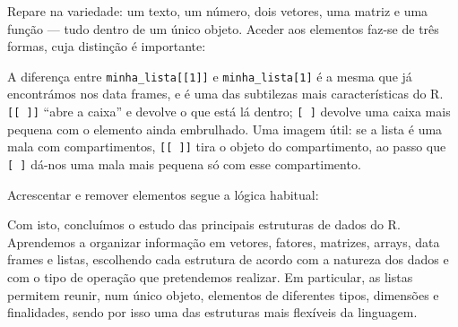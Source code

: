 \documentclass[
  portuguese,
  11pt,
  openany]{book}
\newenvironment{Shaded}{\begin{snugshade}}{\end{snugshade}}
\newcommand{\CommentTok}[1]{\textcolor[rgb]{0.56,0.35,0.01}{\textit{#1}}}
\newcommand{\ConstantTok}[1]{\textcolor[rgb]{0.56,0.35,0.01}{#1}}
\newcommand{\DecValTok}[1]{\textcolor[rgb]{0.00,0.00,0.81}{#1}}
\newcommand{\DocumentationTok}[1]{\textcolor[rgb]{0.56,0.35,0.01}{\textbf{\textit{#1}}}}
\newcommand{\FunctionTok}[1]{\textcolor[rgb]{0.13,0.29,0.53}{\textbf{#1}}}
\newcommand{\NormalTok}[1]{#1}
\newcommand{\OtherTok}[1]{\textcolor[rgb]{0.56,0.35,0.01}{#1}}
\newcommand{\SpecialCharTok}[1]{\textcolor[rgb]{0.81,0.36,0.00}{\textbf{#1}}}
\begin{document}
Repare na variedade: um texto, um número, dois vetores, uma matriz e uma função ---
tudo dentro de um único objeto. Aceder aos elementos faz-se de três formas, cuja
distinção é importante:

\begin{Shaded}
\end{Shaded}

A diferença entre \texttt{minha\_lista{[}{[}1{]}{]}} e \texttt{minha\_lista{[}1{]}} é a mesma que já
encontrámos nos data frames, e é uma das subtilezas mais características do R.
\texttt{{[}{[}\ {]}{]}} ``abre a caixa'' e devolve o que está lá dentro; \texttt{{[}\ {]}} devolve uma caixa
mais pequena com o elemento ainda embrulhado. Uma imagem útil: se a lista é uma
mala com compartimentos, \texttt{{[}{[}\ {]}{]}} tira o objeto do compartimento, ao passo que
\texttt{{[}\ {]}} dá-nos uma mala mais pequena só com esse compartimento.

Acrescentar e remover elementos segue a lógica habitual:

\begin{Shaded}
\end{Shaded}

Com isto, concluímos o estudo das principais estruturas de dados do R. Aprendemos a organizar informação em vetores, fatores, matrizes, arrays, data frames e listas, escolhendo cada estrutura de acordo com a natureza dos dados e com o tipo de operação que pretendemos realizar. Em particular, as listas permitem reunir, num único objeto, elementos de diferentes tipos, dimensões e finalidades, sendo por isso uma das estruturas mais flexíveis da linguagem.
\end{document}
